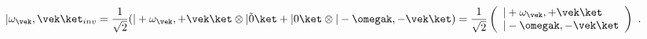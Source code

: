 \begin{equation}
     |\omega_{\vek},\vek\ket_{inv}   = \frac{1}{\sqrt{2}}
      (|+\omega_{\vek},+\vek\ket \otimes |\tilde{0}\ket
      + |0\ket\otimes  |-\omegak ,-\vek\ket )
      = \frac{1}{\sqrt{2}}
     \left( \begin{array}{l} |+\omega_{\vek},+\vek\ket \\
     |-\omegak ,-\vek\ket \end{array} \right) \ .
\end{equation} 
